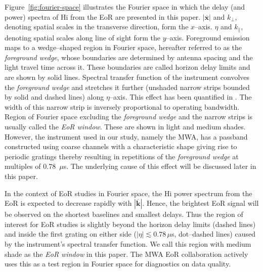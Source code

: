 \documentclass[preprint2,iop,numberedappendix]{emulateapj}
\begin{document}
Figure~\ref{fig:fourier-space} illustrates the Fourier space in which the delay (and power) spectra of H{\sc i} from the EoR are presented in this paper. $|\overline{\mathbf{x}}|$ and $k_\perp$, denoting spatial scales in the transverse direction, form the $x$--axis. $\eta$ and $k_\parallel$, denoting spatial scales along line of sight form the $y$--axis. Foreground emission maps to a wedge--shaped region in Fourier space, hereafter referred to as the {\it foreground wedge}, whose boundaries are determined by antenna spacing and the light travel time across it. These boundaries are called horizon delay limits and are shown by solid lines. Spectral transfer function of the instrument convolves the {\it foreground wedge} and stretches it further (unshaded narrow strips bounded by solid and dashed lines) along $\eta$--axis. This effect has been quantified in \citet{thy13}. The width of this narrow strip is inversely proportional to operating bandwidth. Region of Fourier space excluding the {\it foreground wedge} and the narrow strips is usually called the {\it EoR window}. These are shown in light and medium shades. However, the instrument used in our study, namely the MWA, has a passband constructed using coarse channels with a characteristic shape giving rise to periodic gratings thereby resulting in repetitions of the {\it foreground wedge} at multiples of 0.78~$\mu$s. The underlying cause of this effect will be discussed later in this paper. 


In the context of EoR studies in Fourier space, the H{\sc i} power spectrum from the EoR is expected to decrease rapidly with $|\overline{\mathbf{k}}|$. Hence, the brightest EoR signal will be observed on the shortest baselines and smallest delays. Thus the region of interest for EoR studies is slightly beyond the horizon delay limits (dashed lines) and inside the first grating on either side ($|\eta| \lesssim 0.78\,\mu$s, dot--dashed lines) caused by the instrument's spectral transfer function. We call this region with medium shade as the {\it EoR window} in this paper. The MWA EoR collaboration actively uses this as a test region in Fourier space for diagnostics on data quality.
\end{document}
